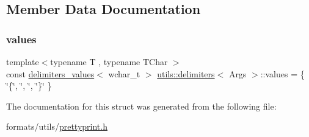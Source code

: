 \subsection{Member Data Documentation}
\mbox{\label{structutils_1_1delimiters_ab9b423d2597b66a5c1866f3b820f8a46}} 
\subsubsection{\texorpdfstring{values}{values}}
{\footnotesize\ttfamily template$<$typename T , typename T\+Char $>$ \\
const \mbox{\hyperlink{structutils_1_1delimiters__values}{delimiters\+\_\+values}}$<$ wchar\+\_\+t $>$ \mbox{\hyperlink{structutils_1_1delimiters}{utils\+::delimiters}}$<$ Args $>$\+::values = \{ \char`\"{}\{\char`\"{}, \char`\"{}, \char`\"{}, \char`\"{}\}\char`\"{} \}\hspace{0.3cm}{\ttfamily [static]}}



The documentation for this struct was generated from the following file\+:\begin{DoxyCompactItemize}
\item 
formats/utils/\mbox{\hyperlink{prettyprint_8h}{prettyprint.\+h}}\end{DoxyCompactItemize}
